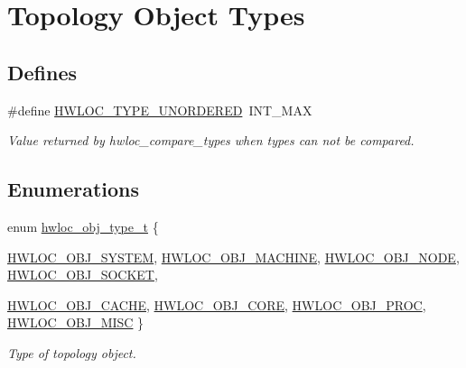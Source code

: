 \hypertarget{group__hwlocality__types}{
\section{Topology Object Types}
\label{group__hwlocality__types}
}
\subsection*{Defines}
\begin{DoxyCompactItemize}
\item 
\#define \hyperlink{group__hwlocality__types_ga3b6e4128e9fe773863b123fa6e4a080b}{HWLOC\_\-TYPE\_\-UNORDERED}~INT\_\-MAX
\begin{DoxyCompactList}\small\item\em Value returned by hwloc\_\-compare\_\-types when types can not be compared. \item\end{DoxyCompactList}\end{DoxyCompactItemize}
\subsection*{Enumerations}
\begin{DoxyCompactItemize}
\item 
enum \hyperlink{group__hwlocality__types_gacd37bb612667dc437d66bfb175a8dc55}{hwloc\_\-obj\_\-type\_\-t} \{ \par
\hyperlink{group__hwlocality__types_ggacd37bb612667dc437d66bfb175a8dc55a3aa1b842d1fd4207ebce171f95a244ec}{HWLOC\_\-OBJ\_\-SYSTEM}, 
\hyperlink{group__hwlocality__types_ggacd37bb612667dc437d66bfb175a8dc55a3f4e83ffc4a259354959ae8a9eaa2a80}{HWLOC\_\-OBJ\_\-MACHINE}, 
\hyperlink{group__hwlocality__types_ggacd37bb612667dc437d66bfb175a8dc55aaf0964881117bdedf1a5e9332cd120dd}{HWLOC\_\-OBJ\_\-NODE}, 
\hyperlink{group__hwlocality__types_ggacd37bb612667dc437d66bfb175a8dc55a1ac6e07775ae4324b3fe9dbd72c785ec}{HWLOC\_\-OBJ\_\-SOCKET}, 
\par
\hyperlink{group__hwlocality__types_ggacd37bb612667dc437d66bfb175a8dc55a56ee0b7eca88f363b75b34fdde8c9ddc}{HWLOC\_\-OBJ\_\-CACHE}, 
\hyperlink{group__hwlocality__types_ggacd37bb612667dc437d66bfb175a8dc55ac793958f330bca371aa1535de8aff45f}{HWLOC\_\-OBJ\_\-CORE}, 
\hyperlink{group__hwlocality__types_ggacd37bb612667dc437d66bfb175a8dc55a5e0ccbbd5922cbb07b53fe892b91b8f2}{HWLOC\_\-OBJ\_\-PROC}, 
\hyperlink{group__hwlocality__types_ggacd37bb612667dc437d66bfb175a8dc55a19f8a6953fa91efc76bcbcdf2d22de4d}{HWLOC\_\-OBJ\_\-MISC}
 \}
\begin{DoxyCompactList}\small\item\em Type of topology object. \item\end{DoxyCompactList}\end{DoxyCompactItemize}
